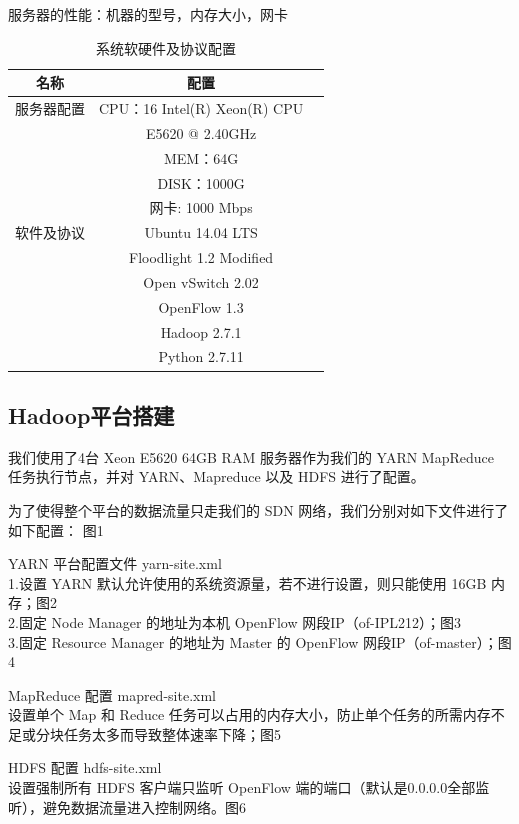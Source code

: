 \documentclass[a4paper, 11pt]{article}                                                   %
\begin{document}
\begin{CJK*}{UTF8}{song}
服务器的性能：机器的型号，内存大小，网卡
\begin{table}[!htb]
\caption{系统软硬件及协议配置} \label{table:confg}
\centering
\begin{tabular}{|c|c|c|}
  \hline
  名称 &  配置 \\
  \hline
  服务器配置   &  CPU：16 Intel(R) Xeon(R) CPU\\
             &    E5620 @ 2.40GHz\\
             &    MEM：64G\\
             &    DISK：1000G\\
             &  网卡: 1000 Mbps\\
  \hline
  软件及协议 & Ubuntu 14.04 LTS \\
             & Floodlight 1.2 Modified\\
             & Open vSwitch 2.02 \\
             & OpenFlow 1.3 \\
             & Hadoop 2.7.1    \\
             & Python 2.7.11    \\
  \hline
\end{tabular}
\end{table}

\subsection{Hadoop平台搭建}
我们使用了4台 Xeon E5620 64GB RAM 服务器作为我们的 YARN MapReduce 任务执行节点，并对 YARN、Mapreduce 以及 HDFS 进行了配置。

为了使得整个平台的数据流量只走我们的 SDN 网络，我们分别对如下文件进行了如下配置：
图1

YARN 平台配置文件 yarn-site.xml\\
1.设置 YARN 默认允许使用的系统资源量，若不进行设置，则只能使用 16GB 内存；图2\\
2.固定 Node Manager 的地址为本机 OpenFlow 网段IP（of-IPL212）；图3\\
3.固定 Resource Manager 的地址为 Master 的 OpenFlow 网段IP（of-master）；图4
\bigskip

MapReduce 配置 mapred-site.xml\\
设置单个 Map 和 Reduce 任务可以占用的内存大小，防止单个任务的所需内存不足或分块任务太多而导致整体速率下降；图5
\bigskip

HDFS 配置 hdfs-site.xml\\
设置强制所有 HDFS 客户端只监听 OpenFlow 端的端口（默认是0.0.0.0全部监听），避免数据流量进入控制网络。图6
\bigskip


\end{CJK*}
\end{document}
